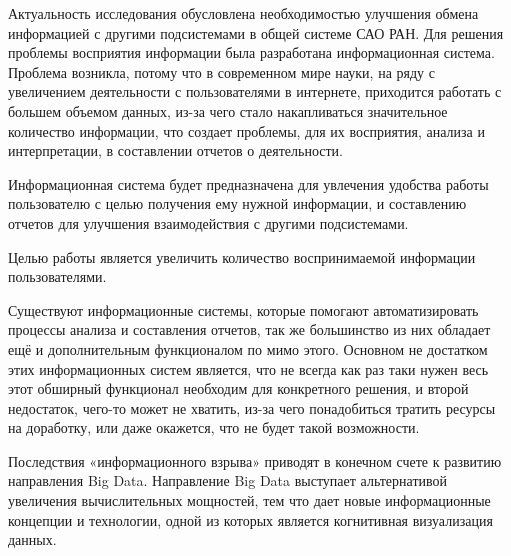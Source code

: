 Актуальность исследования обусловлена необходимостью улучшения обмена информацией с другими подсистемами в общей системе САО РАН. Для решения проблемы восприятия информации была разработана информационная система. Проблема возникла, потому что в современном мире науки, на ряду с увеличением деятельности с пользователями в интернете, приходится работать с большем объемом данных, из-за чего стало накапливаться значительное количество информации, что создает проблемы, для их восприятия, анализа и интерпретации, в составлении отчетов о деятельности. 

Информационная система будет предназначена для увлечения удобства работы пользователю с целью получения ему нужной информации, и составлению отчетов для улучшения взаимодействия с другими подсистемами.

Целью работы является увеличить количество воспринимаемой информации пользователями. 

Существуют информационные системы, которые помогают автоматизировать процессы анализа и составления отчетов, так же большинство из них обладает ещё и дополнительным функционалом по мимо этого. Основном не достатком этих информационных систем является, что не всегда как раз таки нужен весь этот обширный функционал необходим для конкретного решения, и второй недостаток, чего-то может не хватить, из-за чего понадобиться тратить ресурсы на доработку, или даже окажется, что не будет такой возможности.



Последствия «информационного взрыва» приводят в конечном счете к развитию направления Big Data. Направление Big Data выступает альтернативой увеличения вычислительных мощностей, тем что дает новые информационные концепции и технологии, одной из которых является когнитивная визуализация данных.


